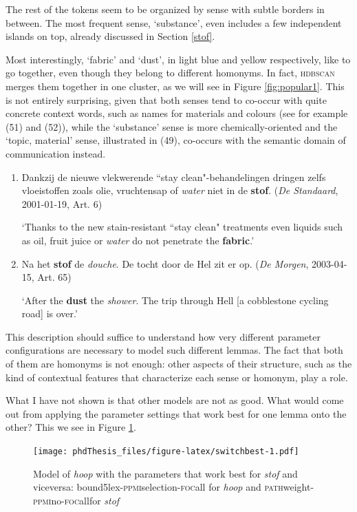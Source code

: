 \documentclass[
]{book}
\begin{document}
The rest of the tokens seem to be organized by sense with subtle borders in between. The most frequent sense, `substance', even includes a few independent islands on top, already discussed in Section \ref{stof}.

Most interestingly, `fabric' and `dust', in light blue and yellow respectively, like to go together, even though they belong to different homonyms. In fact, \textsc{hdbscan} merges them together in one cluster, as we will see in Figure \ref{fig:popular1}. This is not entirely surprising, given that both senses tend to co-occur with quite concrete context words, such as names for materials and colours (see for example (51) and (52)), while the `substance' sense is more chemically-oriented and the `topic, material' sense, illustrated in (49), co-occurs with the semantic domain of communication instead.

\begin{enumerate}
\def\labelenumi{(\arabic{enumi})}
\setcounter{enumi}{50}
\item
  Dankzij de nieuwe vlekwerende ``stay clean"-behandelingen dringen zelfs vloeistoffen zoals olie, vruchtensap of \emph{water} niet in de \textbf{stof}. (\emph{De Standaard}, 2001-01-19, Art. 6)

  `Thanks to the new stain-resistant ``stay clean" treatments even liquids such as oil, fruit juice or \emph{water} do not penetrate the \textbf{fabric}.'
\item
  Na het \textbf{stof} de \emph{douche}. De tocht door de Hel zit er op. (\emph{De Morgen}, 2003-04-15, Art. 65)

  `After the \textbf{dust} the \emph{shower}. The trip through Hell {[}a cobblestone cycling road{]} is over.'
\end{enumerate}

This description should suffice to understand how very different parameter configurations are necessary to model such different lemmas. The fact that both of them are homonyms is not enough: other aspects of their structure, such as the kind of contextual features that characterize each sense or homonym, play a role.

What I have not shown is that other models are not as good. What would come out from applying the parameter settings that work best for one lemma onto the other? This we see in Figure \ref{fig:switchbest}.



\begin{figure}
\centering
\texttt{[image: phdThesis\_files/figure-latex/switchbest-1.pdf]}
\caption{\label{fig:switchbest}Model of \emph{hoop} with the parameters that work best for \emph{stof} and viceversa: bound5lex-\textsc{ppmi}selection-\textsc{foc}all for \emph{hoop} and \textsc{path}weight-\textsc{ppmi}no-\textsc{foc}allfor \emph{stof}}
\end{figure}
\end{document}

